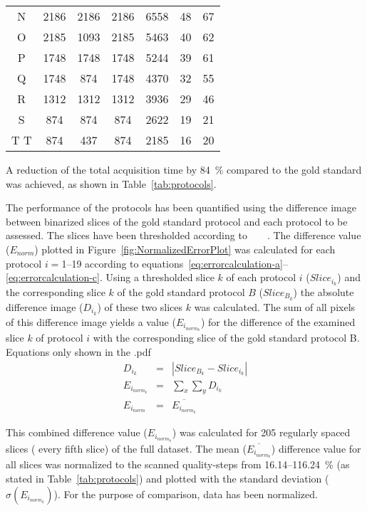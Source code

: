 \begin{table}
\begin{tabular}{ccccccc}
		N & 2186 & 2186 & 2186 & 6558  &  48 & 67\\%
		O & 2185 & 1093 & 2185 & 5463  &  40 & 62\\%
		P & 1748 & 1748 & 1748 & 5244  &  39 & 61\\%
		Q & 1748 & 874  & 1748 & 4370  &  32 & 55\\%
		R & 1312 & 1312 & 1312 & 3936  &  29 & 46\\%
		S & 874  & 874  & 874  & 2622  &  19 & 21\\%
		\ifiucr
			\rowcolor{lightgray} T
		\else
		 	T
		 \fi
          & 874  & 437  & 874  & 2185  &  16  & 20\\%
	\end{tabular}%
\end{table}

A reduction of the total acquisition time by \SI{84}{\percent} compared to the gold standard was achieved, as shown in Table~\ref{tab:protocols}.

The performance of the protocols has been quantified using the difference image between binarized slices of the gold standard protocol and each protocol to be assessed. The slices have been thresholded according to%
\ifhtml%
	~\citet{Otsu1979}%
\else%
	~%
\fi%
. The difference value ($E_{norm}$) plotted in Figure~\ref{fig:NormalizedErrorPlot} was calculated for each protocol $i=$1--19 according to equations~\ref{eq:errorcalculation-a}--\ref{eq:errorcalculation-c}. Using a thresholded slice $k$ of each protocol $i$ ($Slice_{i_{k}}$) and the corresponding slice $k$ of the gold standard protocol $B$ ($Slice_{B_{k}}$) the absolute difference image ($D_{i_{k}}$) of these two slices $k$ was calculated. The sum of all pixels of this difference image yields a value ($E_{i_{norm_{k}}}$) for the difference of the examined slice $k$ of protocol $i$ with the corresponding slice of the gold standard protocol B.
\ifhtml
	\\Equations only shown in the .pdf\label{eq:errorcalculation-a}\label{eq:errorcalculation-b}\label{eq:errorcalculation-c}
\else
	\begin{eqnarray}%
		D_{i_{k}} &=& |Slice_{B_{k}}-Slice_{i_{k}}|\label{eq:errorcalculation-a}\\%
		E_{i_{norm_{k}}} &=& \sum_{x}\sum_{y} D_{i_{k}}\label{eq:errorcalculation-b}\\%
		E_{i_{norm}} &=& \overline{E_{i_{norm_{k}}}}\label{eq:errorcalculation-c}%
	\end{eqnarray}%
\fi

This combined difference value ($E_{i_{norm_{k}}}$) was calculated for 205 regularly spaced slices (%
every fifth slice) of the full dataset. The mean ($\overline{E_{i_{norm_{k}}}}$) difference value for all slices was normalized to the scanned quality-steps from 16.14--\SI{116.24}{\percent} (as stated in Table~\ref{tab:protocols}) and plotted with the standard deviation ($\sigma(E_{i_{norm_{k}}})$). For the purpose of comparison, data has been normalized.

